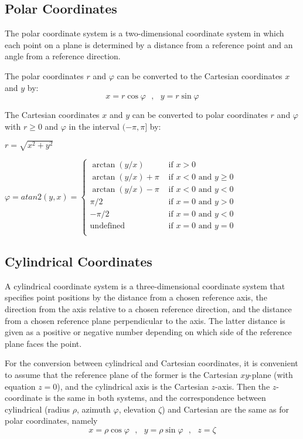 \subsection{Polar Coordinates}
The polar coordinate system is a two-dimensional coordinate system in which each point on a plane is determined by a distance from a reference point and an angle from a reference direction.

The polar coordinates $r$ and $\varphi$ can be converted to the Cartesian coordinates $x$ and $y$ by:
\[
x=r\cos \varphi  ~~~, ~~~ y=r\sin \varphi
\]

The Cartesian coordinates $x$ and $y$ can be converted to polar coordinates $r$ and $\varphi$ with $r \ge 0$ and $\varphi$ in the interval $(-\pi, \pi]$ by:

$ \displaystyle r= \sqrt{ x^2 + y^2 } $

$ \displaystyle \varphi = atan2(y,x) = 
\begin{cases}
\arctan(y/x) & \text{ if } x>0 \\
\arctan(y/x) + \pi & \text{ if } x<0 \text{ and } y\ge0\\
\arctan(y/x) - \pi & \text{ if } x<0 \text{ and } y<0\\
\pi/2 & \text{ if } x=0 \text{ and } y>0\\
-\pi/2 & \text{ if } x=0 \text{ and } y<0\\
\text{undefined} & \text{ if } x=0 \text{ and } y=0\\
\end{cases}
$



\subsection{Cylindrical Coordinates}
A cylindrical coordinate system is a three-dimensional coordinate system that specifies point positions by the distance from a chosen reference axis, the direction from the axis relative to a chosen reference direction, and the distance from a chosen reference plane perpendicular to the axis. The latter distance is given as a positive or negative number depending on which side of the reference plane faces the point.

For the conversion between cylindrical and Cartesian coordinates, it is convenient to assume that the reference plane of the former is the Cartesian $xy$-plane (with equation $z = 0$), and the cylindrical axis is the Cartesian $z$-axis. Then the $z$-coordinate is the same in both systems, and the correspondence between cylindrical (radius $\rho$, azimuth $\varphi$, elevation $\zeta$) and Cartesian are the same as for polar coordinates, namely
\[
x=\rho \cos \varphi  ~~~, ~~~ y=\rho \sin \varphi ~~~, ~~~ z=\zeta
\]

